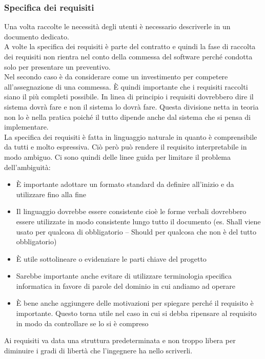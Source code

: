 \subsubsection{Specifica dei requisiti}
Una volta raccolte le necessità degli utenti è necessario descriverle in un documento dedicato.\\
A volte la specifica dei requisiti è parte del contratto e quindi la fase di raccolta dei requisiti non rientra nel conto della commessa del software perché condotta solo per presentare un preventivo.\\
Nel secondo caso è da considerare come un investimento per competere all'assegnazione di una commessa.
È quindi importante che i requisiti raccolti siano il più completi possibile.
In linea di principio i requisiti dovrebbero dire  il sistema dovrà fare e non  il sistema lo dovrà fare.
Questa divisione netta in teoria non lo è nella pratica poiché il tutto dipende anche dal sistema che si pensa di implementare.\\
La specifica dei requisiti è fatta in linguaggio naturale in quanto è comprensibile da tutti e molto espressiva.
Ciò però può rendere il requisito interpretabile in modo ambiguo.
Ci sono quindi delle linee guida per limitare il problema dell'ambiguità:
\begin{itemize}[noitemsep]
    \item È importante adottare un formato standard da definire all'inizio e da utilizzare fino alla fine
    \item Il linguaggio dovrebbe essere consistente cioè le forme verbali dovrebbero essere utilizzate in modo consistente lungo tutto il documento (es. Shall viene usato per qualcosa di obbligatorio – Should per qualcosa che non è del tutto obbligatorio)
    \item È utile sottolineare o evidenziare le parti chiave del progetto
    \item Sarebbe importante anche evitare di utilizzare terminologia specifica informatica in favore di parole del dominio in cui andiamo ad operare
    \item È bene anche aggiungere delle motivazioni per spiegare perché il requisito è importante. Questo torna utile nel caso in cui si debba ripensare al requisito in modo da controllare se lo si è compreso
\end{itemize}
Ai requisiti va data una struttura predeterminata e non troppo libera per diminuire i gradi di libertà che l'ingegnere ha nello scriverli.\\
